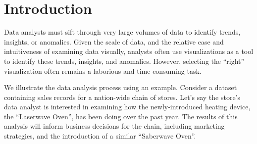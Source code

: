 
\section{Introduction}
\label{sec:introduction}


Data analysts must sift through very large volumes of data 
to identify trends, insights, or anomalies. 
Given the scale of data, and the relative ease and 
intuitiveness of examining data visually,
analysts often use visualizations as a tool to identify
these trends, insights, and anomalies.
However, selecting the ``right'' visualization often 
remains a laborious and time-consuming task. 

We illustrate the data analysis process using an example. 
Consider a dataset containing sales records for a nation-wide
chain of stores.
Let's say the store's data analyst is interested
in examining how the newly-introduced heating device, the ``Laserwave
Oven'', has been doing over the past year.
The results of this analysis will inform business decisions
for the chain, including marketing strategies, and the introduction of a similar
``Saberwave Oven''.

